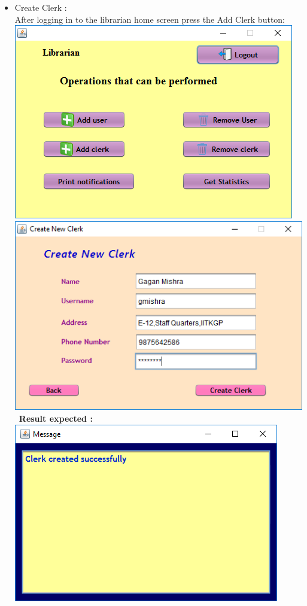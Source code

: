 \documentclass{article}
\begin{document}
\begin{enumerate}
\begin{itemize}
\item Create Clerk :\\
After logging in to the librarian home screen press the Add Clerk button:\\
\includegraphics[scale=0.8]{images/LibrarianLogin/LibrarianHomeScreen.PNG}\\
\includegraphics[scale=0.8]{images/LibrarianLogin/Actions/CreateClerk/ClerkDetails.PNG}\\\
\textbf{Result expected :}
\includegraphics[scale=0.8]{images/LibrarianLogin/Actions/CreateClerk/ClerkCreated.PNG}\\

\end{itemize}
\end{enumerate}
\end{document}
